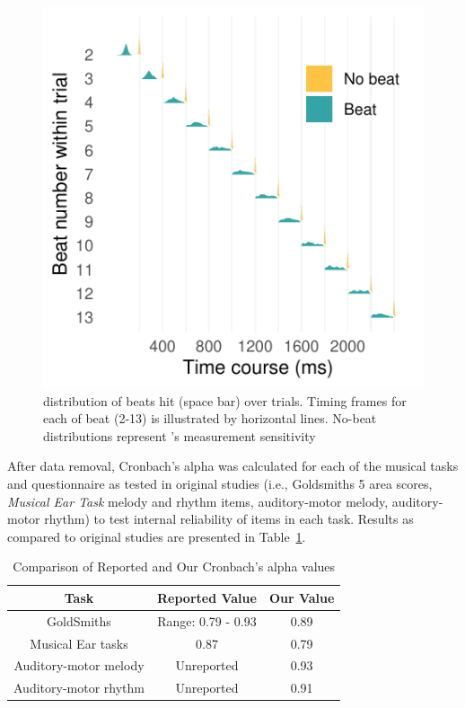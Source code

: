 \documentclass[a4paper]{article}
\begin{document}
\begin{figure}[t]
  \centering
  \includegraphics[width=\linewidth]{SP_24_visuals/Correct_and_Incorrect_distrubutions_by_beat_across_trial.pdf}
  \caption{distribution of beats hit (space bar) over trials. Timing frames for each of beat (2-13) is illustrated by horizontal lines. No-beat distributions represent \cite{gorilla_Anwyl-Irvine_2019}'s measurement sensitivity}
  \label{fig:beat_data}
\end{figure}

After data removal, Cronbach's alpha was calculated for each of the musical tasks and questionnaire as tested in original studies (i.e., Goldsmiths 5 area scores, \textit{Musical Ear Task} melody and rhythm items, auditory-motor melody, auditory-motor rhythm) to test internal reliability of items in each task. Results as compared to original studies are presented in Table~\ref{tab:comparison}. 

\begin{table}[ht]
\centering
\begin{tabular}{|c|c|c|}
\hline
\textbf{Task} & \textbf{Reported Value} & \textbf{Our Value} \\
\hline
GoldSmiths \cite{Müllensiefen_Gingras_Musil_Stewart_2014} & Range: 0.79 - 0.93 & 0.89 \\
Musical Ear tasks \cite{Wallentin_Nielsen_Friis-Olivarius_Vuust_Vuust_2010}& 0.87 & 0.79 \\
Auditory-motor melody \cite{Kachlicka_Saito_Tierney_2019}& Unreported & 0.93 \\
Auditory-motor rhythm\cite{Kachlicka_Saito_Tierney_2019}& Unreported & 0.91 \\
\hline
\end{tabular}
\caption{Comparison of Reported and Our Cronbach's alpha values}
\label{tab:comparison}
\end{table}
\end{document}
